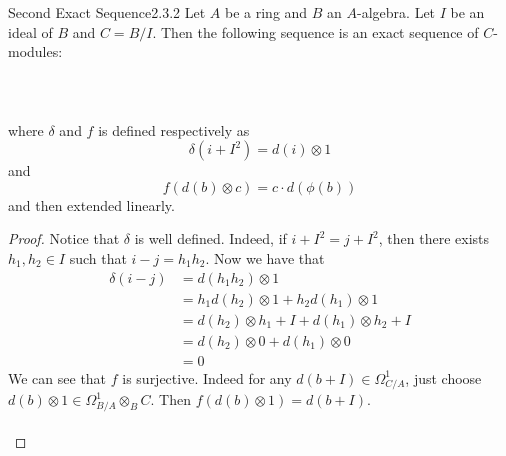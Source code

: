 \documentclass[a4paper]{article}
\begin{document}
\begin{thm}{Second Exact Sequence}{2.3.2} Let $A$ be a ring and $B$ an $A$-algebra. Let $I$ be an ideal of $B$ and $C=B/I$. Then the following sequence is an exact sequence of $C$-modules: \\~\\
\\~\\
where $\delta$ and $f$ is defined respectively as $$\delta(i+I^2)=d(i)\otimes 1$$ and $$f(d(b)\otimes c)=c\cdot d(\phi(b))$$ and then extended linearly. \tcbline
\begin{proof}
Notice that $\delta$ is well defined. Indeed, if $i+I^2=j+I^2$, then there exists $h_1,h_2\in I$ such that $i-j=h_1h_2$. Now we have that 
\begin{align*}
\delta(i-j)&=d(h_1h_2)\otimes 1\\
&=h_1d(h_2)\otimes 1+h_2d(h_1)\otimes 1\\
&=d(h_2)\otimes h_1+I+d(h_1)\otimes h_2+I\\
&=d(h_2)\otimes 0+d(h_1)\otimes 0\\
&=0
\end{align*}
We can see that $f$ is surjective. Indeed for any $d(b+I)\in\Omega_{C/A}^1$, just choose $d(b)\otimes 1\in\Omega_{B/A}^1\otimes_BC$. Then $f(d(b)\otimes 1)=d(b+I)$. \\~\\


\end{proof}
\end{thm}
\end{document}
